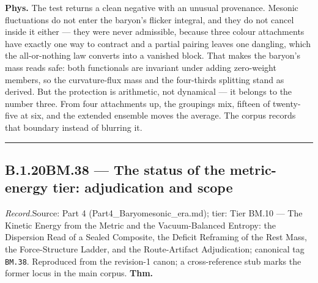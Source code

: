 \documentclass[11pt,openany]{report}
\theoremstyle{canonplain}
\theoremstyle{canondef}
\begin{document}
\textbf{Phys.} The test returns a clean negative with an unusual provenance. Mesonic fluctuations do not enter the baryon's flicker integral, and they do not cancel inside it either — they were never admissible, because three colour attachments have exactly one way to contract and a partial pairing leaves one dangling, which the all-or-nothing law converts into a vanished block. That makes the baryon's mass reads safe: both functionals are invariant under adding zero-weight members, so the curvature-flux mass and the four-thirds splitting stand as derived. But the protection is arithmetic, not dynamical — it belongs to the number three. From four attachments up, the groupings mix, fifteen of twenty-five at six, and the extended ensemble moves the average. The corpus records that boundary instead of blurring it.

\vspace{2pt}\noindent\rule{\textwidth}{0.4pt}\vspace{2pt}

\medskip
\subsection*{\texorpdfstring{B.1.20\quad BM.38 — The status of the metric-energy tier: adjudication and scope}{BM.38 B.1.20}}
\label{tag:BM-38}
{\small \textit{Record.}\quad Source: Part 4 (Part4\_Baryomesonic\_era.md); tier: Tier BM.10 — The Kinetic Energy from the Metric and the Vacuum-Balanced Entropy: the Dispersion Read of a Sealed Composite, the Deficit Reframing of the Rest Mass, the Force-Structure Ladder, and the Route-Artifact Adjudication; canonical tag \texttt{BM.38}. Reproduced from the revision-1 canon; a cross-reference stub marks the former locus in the main corpus.}
\medskip
\textbf{Thm.}
\end{document}
